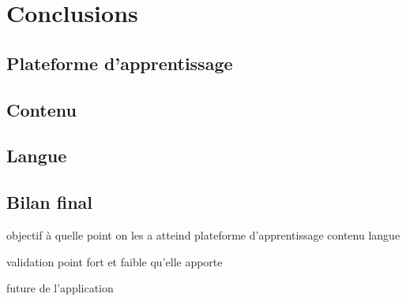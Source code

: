 \chapter{Conclusions}
\section{Plateforme d'apprentissage}
\section{Contenu}
\section{Langue}
\section{Bilan final}






objectif à quelle point on les a atteind
	plateforme d'apprentissage
	contenu
	langue
	
validation 
	point fort et faible qu'elle apporte

future de l'application